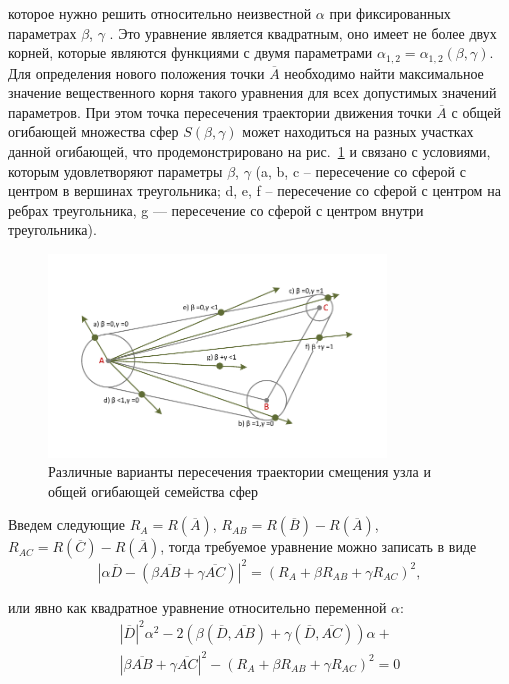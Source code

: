 которое нужно решить относительно неизвестной $\alpha$ при фиксированных параметрах $\beta$, $\gamma$ .
Это уравнение является квадратным, оно имеет не более двух корней, которые являются функциями с двумя параметрами $\alpha_{1,2} = \alpha_{1,2}(\beta,\gamma)$.
Для определения нового положения точки $\overline{A}$ необходимо найти максимальное значение вещественного корня такого уравнения для всех допустимых значений параметров.
При этом точка пересечения траектории движения точки $\overline{A}$ с общей огибающей множества сфер $S(\beta,\gamma)$ может находиться на разных участках данной огибающей, что продемонстрировано на рис.~\ref{fig:text_1_remesh_common_envelope_2} и связано с условиями, которым удовлетворяют параметры $\beta$, $\gamma$ (a, b, c -- пересечение со сферой с центром в вершинах треугольника; d, e, f -- пересечение со сферой с центром на ребрах треугольника, g — пересечение со сферой с центром внутри треугольника).

\begin{figure}[ht]
	\centering
		\includegraphics[width=0.80\textwidth]{./pics/text_1_remesh_common_envelope/triangle2.pdf}
	\caption{Различные варианты пересечения траектории смещения узла и общей огибающей семейства сфер}
	\label{fig:text_1_remesh_common_envelope_2}
\end{figure}

Введем следующие $R_A = R(\overline{A})$, $R_{AB} = R(\overline{B}) - R(\overline{A})$, $R_{AC} = R(\overline{C}) - R(\overline{A})$, тогда требуемое уравнение можно записать в виде
\begin{equation}
	|\alpha \overline{D} - (\beta \overline{AB} + \gamma \overline{AC})|^2 = (R_A + \beta R_{AB} + \gamma R_{AC})^2,
\end{equation}

или явно как квадратное уравнение относительно переменной $\alpha$:
\begin{multline}
	|\overline{D}|^2 \alpha^2 - 2(\beta (\overline{D}, \overline{AB}) + \gamma (\overline{D}, \overline{AC})) \alpha + \\
	|\beta \overline{AB} + \gamma \overline{AC}|^2 - (R_A + \beta R_{AB} + \gamma R_{AC})^2 = 0
\end{multline}

